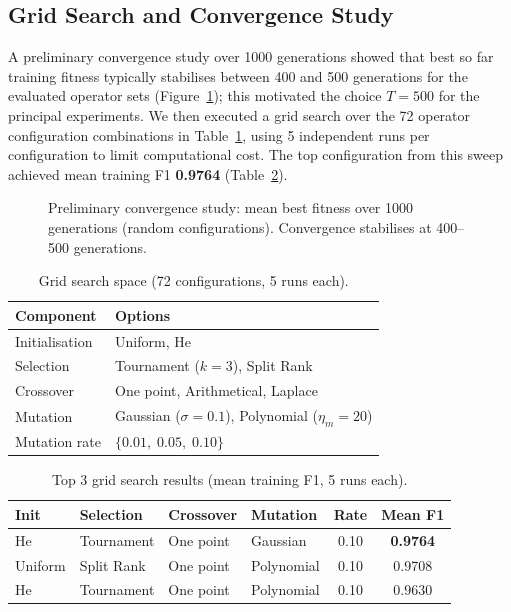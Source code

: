 \documentclass[12pt, a4paper]{article}
\newcommand{\rowhead}{\rowcolor{primary}\color{white}\bfseries}
\begin{document}
\subsection{Grid Search and Convergence Study}
\label{sec:gridsearch}

 A preliminary convergence study over 1000 generations showed that best so far training fitness typically stabilises between 400 and 500 generations for the evaluated operator sets (Figure~\ref{fig:prelim}); this motivated the choice $T=500$ for the principal experiments. We then executed a grid search over the 72 operator configuration combinations in Table~\ref{tab:gridsearch_space}, using 5 independent runs per configuration to limit computational cost. The top configuration from this sweep achieved mean training F1 \textbf{0.9764} (Table~\ref{tab:gridsearch_top}).

\begin{figure}[H]
    \centering
    \caption{Preliminary convergence study: mean best fitness over 1000 generations (random configurations). Convergence stabilises at 400--500 generations.}
    \label{fig:prelim}
\end{figure}

\begin{table}[H]
\centering
\renewcommand{\arraystretch}{1.3}
\begin{tabular}{ll}
\toprule
\rowhead Component & \multicolumn{1}{l}{\color{white}Options} \\
\midrule
Initialisation & Uniform, He \\
Selection      & Tournament ($k=3$), Split Rank \\
Crossover      & One point, Arithmetical, Laplace \\
Mutation       & Gaussian ($\sigma=0.1$), Polynomial ($\eta_m=20$) \\
Mutation rate  & $\{0.01,\; 0.05,\; 0.10\}$ \\
\bottomrule
\end{tabular}
\caption{Grid search space (72 configurations, 5 runs each).}
\label{tab:gridsearch_space}
\end{table}

\begin{table}[H]
\centering
\renewcommand{\arraystretch}{1.3}
\begin{tabular}{llllcc}
\toprule
\rowhead Init & \color{white}Selection & \color{white}Crossover & \color{white}Mutation & \color{white}Rate & \color{white}Mean F1 \\
\midrule
He      & Tournament & One point & Gaussian   & 0.10 & \textbf{0.9764} \\
Uniform & Split Rank & One point & Polynomial & 0.10 & 0.9708 \\
He      & Tournament & One point & Polynomial & 0.10 & 0.9630 \\
\bottomrule
\end{tabular}
\caption{Top 3 grid search results (mean training F1, 5 runs each).}
\label{tab:gridsearch_top}
\end{table}
\end{document}
